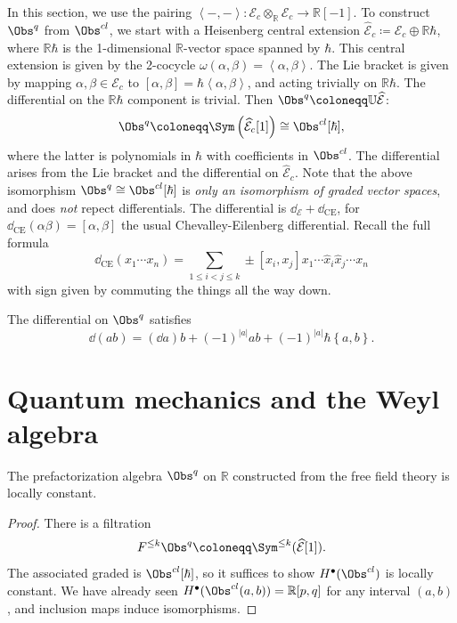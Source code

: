 In this section, we use the pairing $\left\langle -,- \right\rangle : \mathcal{E} _c\otimes _\mathbb{R} \mathcal{E} _c \to \mathbb{R} [-1]$. To construct $\Obs^{q} $ from $\Obs^{cl} $, we start with a Heisenberg central extension $\widehat{\mathcal{E} }_c\coloneqq \mathcal{E} _c \oplus \mathbb{R} \hbar $, where $\mathbb{R} \hbar $ is the 1-dimensional $\mathbb{R} $-vector space spanned by $\hbar $. This central extension is given by the 2-cocycle $\omega (\alpha ,\beta )=\left\langle \alpha , \beta  \right\rangle $. The Lie bracket is given by mapping $\alpha ,\beta \in \mathcal{E} _c$ to $[\alpha ,\beta ]=\hbar \left\langle \alpha ,\beta  \right\rangle $, and acting trivially on $\mathbb{R} \hbar $. The differential on the $\mathbb{R} \hbar $ component is trivial. Then $\Obs^{q} \coloneqq \mathbb{U} \widehat{\mathcal{E} }$:
\[
	\Obs^{q} \coloneqq \Sym \left( \widehat{\mathcal{E} }_c[1]  \right) \cong \Obs^{cl} [\hbar ]
,\]
where the latter is polynomials in $\hbar $ with coefficients in $\Obs^{cl} $. The differential arises from the Lie bracket and the differential on $\widehat{\mathcal{E} }_c$. Note that the above isomorphism $\Obs^{q} \cong \Obs^{cl} [\hbar ]$ is \emph{only an isomorphism of graded vector spaces}, and does \emph{not} repect differentials. The differential is $\dd _{\mathcal{E} } +\dd _{\mathrm{CE} }$, for $\dd_{\mathrm{CE} }( \alpha\beta )=[\alpha ,\beta ]$ the usual Chevalley-Eilenberg differential. Recall the full formula
\[
	\dd _{\mathrm{CE} }(x_1 \cdots x_n) = \sum_{1\leq i<j\leq k} \pm[x_i,x_j]x_1 \cdots \widehat{x} _i \widehat{x} _j \cdots x_n
\]
with sign given by commuting the things all the way down.

The differential on $\Obs^{q} $ satisfies
\begin{equation}\label{eq:4-2-6-1}
	\dd (ab)=(\dd a)b + (-1)^{\left| a \right| } ab + (-1)^{\left| a \right| } \hbar \left\{ a,b \right\} .
\end{equation}


\section{Quantum mechanics and the Weyl algebra}

\begin{lemma}\label{lma:4-3-1}
	The prefactorization algebra $\Obs^{q} $ on $\mathbb{R} $ constructed from the free field theory is locally constant.
\end{lemma}
\begin{proof}
	There is a filtration
	\[
		F^{\leq k} \Obs^{q} \coloneqq \Sym ^{\leq k} (\widehat{\mathcal{E} }[1])
	.\]
	The associated graded is $\Obs^{cl} [\hbar ]$, so it suffices to show $H^{\bullet} (\Obs^{cl} )$ is locally constant. We have already seen $H^{\bullet} (\Obs^{cl} (a,b))=\mathbb{R} [p,q]$ for any interval $(a,b)$, and inclusion maps induce isomorphisms.
\end{proof}

